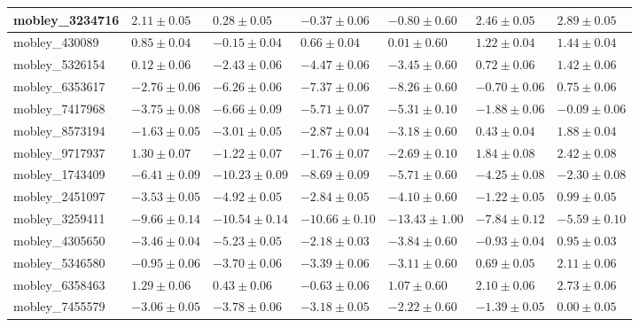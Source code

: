 \documentclass{article}
\begin{document}
\begin{landscape}
\begin{longtable}{|l{3.0cm}|l{3.0cm}|l{3.2cm}|l{3.6cm}|l{3.0cm}|l{3.0cm}|l{3.0cm}|}
mobley\_3234716	&	$	2.11	\pm	0.05	$	&	$	0.28	\pm	0.05	$	&	$	-0.37	\pm	0.06	$	&	$	-0.80	\pm	0.60	$	&	$	2.46	\pm	0.05	$	&	$	2.89	\pm	0.05	$	\\ \hline
mobley\_430089	&	$	0.85	\pm	0.04	$	&	$	-0.15	\pm	0.04	$	&	$	0.66	\pm	0.04	$	&	$	0.01	\pm	0.60	$	&	$	1.22	\pm	0.04	$	&	$	1.44	\pm	0.04	$	\\ \hline
mobley\_5326154	&	$	0.12	\pm	0.06	$	&	$	-2.43	\pm	0.06	$	&	$	-4.47	\pm	0.06	$	&	$	-3.45	\pm	0.60	$	&	$	0.72	\pm	0.06	$	&	$	1.42	\pm	0.06	$	\\ \hline
mobley\_6353617	&	$	-2.76	\pm	0.06	$	&	$	-6.26	\pm	0.06	$	&	$	-7.37	\pm	0.06	$	&	$	-8.26	\pm	0.60	$	&	$	-0.70	\pm	0.06	$	&	$	0.75	\pm	0.06	$	\\ \hline
mobley\_7417968	&	$	-3.75	\pm	0.08	$	&	$	-6.66	\pm	0.09	$	&	$	-5.71	\pm	0.07	$	&	$	-5.31	\pm	0.10	$	&	$	-1.88	\pm	0.06	$	&	$	-0.09	\pm	0.06	$	\\ \hline
mobley\_8573194	&	$	-1.63	\pm	0.05	$	&	$	-3.01	\pm	0.05	$	&	$	-2.87	\pm	0.04	$	&	$	-3.18	\pm	0.60	$	&	$	0.43	\pm	0.04	$	&	$	1.88	\pm	0.04	$	\\ \hline
mobley\_9717937	&	$	1.30	\pm	0.07	$	&	$	-1.22	\pm	0.07	$	&	$	-1.76	\pm	0.07	$	&	$	-2.69	\pm	0.10	$	&	$	1.84	\pm	0.08	$	&	$	2.42	\pm	0.08	$	\\ \hline
mobley\_1743409	&	$	-6.41	\pm	0.09	$	&	$	-10.23	\pm	0.09	$	&	$	-8.69	\pm	0.09	$	&	$	-5.71	\pm	0.60	$	&	$	-4.25	\pm	0.08	$	&	$	-2.30	\pm	0.08	$	\\ \hline
mobley\_2451097	&	$	-3.53	\pm	0.05	$	&	$	-4.92	\pm	0.05	$	&	$	-2.84	\pm	0.05	$	&	$	-4.10	\pm	0.60	$	&	$	-1.22	\pm	0.05	$	&	$	0.99	\pm	0.05	$	\\ \hline
mobley\_3259411	&	$	-9.66	\pm	0.14	$	&	$	-10.54	\pm	0.14	$	&	$	-10.66	\pm	0.10	$	&	$	-13.43	\pm	1.00	$	&	$	-7.84	\pm	0.12	$	&	$	-5.59	\pm	0.10	$	\\ \hline
mobley\_4305650	&	$	-3.46	\pm	0.04	$	&	$	-5.23	\pm	0.05	$	&	$	-2.18	\pm	0.03	$	&	$	-3.84	\pm	0.60	$	&	$	-0.93	\pm	0.04	$	&	$	0.95	\pm	0.03	$	\\ \hline
mobley\_5346580	&	$	-0.95	\pm	0.06	$	&	$	-3.70	\pm	0.06	$	&	$	-3.39	\pm	0.06	$	&	$	-3.11	\pm	0.60	$	&	$	0.69	\pm	0.05	$	&	$	2.11	\pm	0.06	$	\\ \hline
mobley\_6358463	&	$	1.29	\pm	0.06	$	&	$	0.43	\pm	0.06	$	&	$	-0.63	\pm	0.06	$	&	$	1.07	\pm	0.60	$	&	$	2.10	\pm	0.06	$	&	$	2.73	\pm	0.06	$	\\ \hline
mobley\_7455579	&	$	-3.06	\pm	0.05	$	&	$	-3.78	\pm	0.06	$	&	$	-3.18	\pm	0.05	$	&	$	-2.22	\pm	0.60	$	&	$	-1.39	\pm	0.05	$	&	$	0.00	\pm	0.05	$	\\ \hline

\end{longtable}
\end{landscape}
\end{document}
